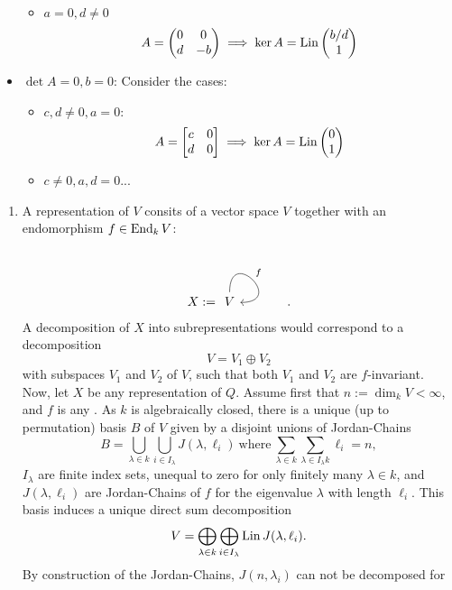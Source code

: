 \begin{sol}
\begin{itemize}
\begin{itemize}
    \item $a=0,d\neq 0$
    \[
    A = \begin{pmatrix}0&0\\d&-b\end{pmatrix}\implies \ker A = \operatorname{Lin} \begin{pmatrix}b/d\\1\end{pmatrix}\]
  \end{itemize}
  \item $\det A =0, b =0$: Consider the cases:
  \begin{itemize}
    \item $c,d\neq 0,a=0$:
    \[
    A = \begin{bmatrix} c&0\\d&0\end{bmatrix}\implies \ker A = \operatorname{Lin} \begin{pmatrix}0\\1\end{pmatrix}\]
    \item $c\neq 0, a,d=0$...
  \end{itemize}
\end{itemize}
\end{sol}

\begin{sol}
  \begin{enumerate}
    \item A representation of $V$ consits of a vector space $V$ together with an endomorphism $f\in \operatorname{End}_k V$:
    \[
    X:=\begin{tikzcd}V\arrow[out=90,in=0,loop,"f"]\end{tikzcd}.
    \]
    A decomposition of $X$ into subrepresentations would correspond to a decomposition
    \[
    V = V_1\oplus V_2
    \]
    with subspaces $V_1$ and $V_2$ of $V$, such that both $V_1$ and $V_2$ are $f$-invariant.
    Now, let $X$ be any representation of $Q$.
    Assume first that $n:=\dim_kV<\infty$, and $f$ is any .
    As $k$ is algebraically closed, there is a unique (up to permutation) basis $B$ of $V$ given by a disjoint unions of Jordan-Chains
    \[
    B =\bigcup_{\lambda \in k}\bigcup_{i\in I_{\lambda}}J(\lambda,\ell_i)~\text{where}~\sum_{\lambda \in k}\sum_{\lambda \in I_{\lambda} k} \ell_i =n,\]
     $I_{\lambda}$ are finite index sets, unequal to zero for only finitely many $\lambda \in k$, and $J(\lambda,\ell_i)$ are Jordan-Chains of $f$ for the eigenvalue $\lambda$ with length $\ell_i$. This basis induces a unique direct sum decomposition
     \[
     V = \bigoplus_{\lambda \in k}\bigoplus_{i\in I_{\lambda}} \operatorname{Lin} J(\lambda,\ell_i).
     \]
     By construction of the Jordan-Chains, $J(n,\lambda_i)$ can not be decomposed for
  \end{enumerate}
\end{sol}

